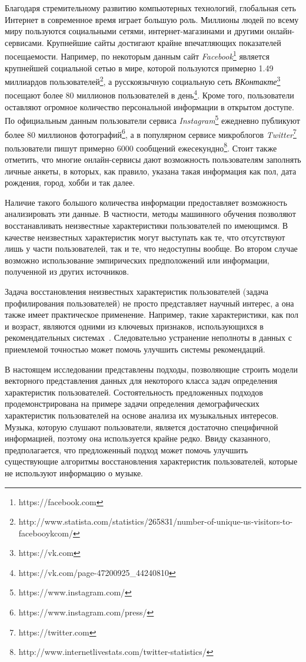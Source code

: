 \startprefacepage

Благодаря стремительному развитию компьютерных технологий, глобальная
сеть Интернет в современное время играет большую роль. Миллионы
людей по всему миру пользуются социальными сетями, интернет-магазинами
и другими онлайн-сервисами. Крупнейшие сайты достигают крайне
впечатляющих показателей посещаемости. Например, по некоторым данным 
сайт \textit{Facebook}\footnote{https://facebook.com}
является крупнейшей социальной сетью в мире, которой пользуются
примерно 1.49 миллиардов пользователей\footnote{http://www.statista.com/statistics/265831/number-of-unique-us-visitors-to-facebooykcom/},
а русскоязычную социальную сеть \textit{ВКонтакте}\footnote{https://vk.com}
посещают более 80 миллионов пользователей в 
день\footnote{https://vk.com/page-47200925\_44240810}. Кроме того,
пользователи оставляют огромное количество персональной информации 
в открытом доступе. По официальным данным пользователи сервиса 
\textit{Instagram}\footnote{https://www.instagram.com/} ежедневно
публикуют более 80 миллионов 
фотографий\footnote{https://www.instagram.com/press/}, а
в популярном сервисе микроблогов \textit{Twitter}\footnote{https://twitter.com}
пользователи пишут примерно 6000 сообщений
ежесекундно\footnote{http://www.internetlivestats.com/twitter-statistics/}.
Стоит также отметить, что многие онлайн-сервисы дают
возможность пользователям заполнять личные анкеты,
в которых, как правило, указана такая информация как
пол, дата рождения, город, хобби и так далее.

Наличие такого большого количества информации предоставляет возможность
анализировать эти данные. В частности, методы машинного обучения 
позволяют восстанавливать неизвестные характеристики пользователей по имеющимся.
В качестве неизвестных характеристик могут выступать как те,
что отсутствуют лишь у части пользователей, так и те, что недоступны
вообще. Во втором случае возможно использование эмпирических
предположений или информации, полученной из других источников.

Задача восстановления неизвестных характеристик пользователей 
(задача профилирования пользователей) не просто представляет
научный интерес, а она также имеет практическое применение. 
Например, такие характеристики, как пол и возраст, являются
одними из ключевых признаков, использующихся в рекомендательных
системах~\cite{swearingen2001beyond,adomavicius2005toward}.
Следовательно устранение неполноты в данных с приемлемой точностью
может помочь улучшить системы рекомендаций.

В настоящем исследовании представлены подходы, позволяющие
строить модели векторного представления данных для некоторого класса
задач определения характеристик пользователей. Состоятельность
предложенных подходов продемонстрирована на примере задачи определения
демографических характеристик пользователей на основе анализа их
музыкальных интересов. Музыка, которую слушают пользователи, является
достаточно специфичной информацией, поэтому она используется крайне редко.
Ввиду сказанного, предполагается, что предложенный подход может помочь
улучшить существующие алгоритмы восстановления характеристик пользователей,
которые не используют информацию о музыке.
